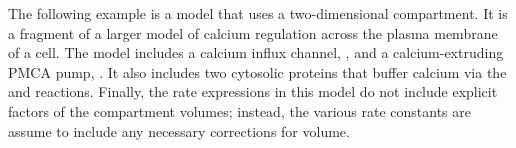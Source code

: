 The following example is a model that uses a two-dimensional
compartment.  It is a fragment of a larger model of calcium
regulation across the plasma membrane of a cell.  The model
includes a calcium influx channel, , and a
calcium-extruding PMCA pump, .  It also includes two
cytosolic proteins that buffer calcium via the
 and
 reactions.  Finally, the
rate expressions in this model do not include explicit factors of
the compartment volumes; instead, the various rate constants are
assume to include any necessary corrections for volume.




